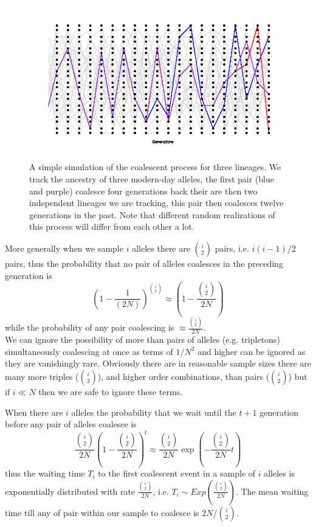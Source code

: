 \begin{figure}
\begin{center}
  \includegraphics[width = \textwidth]{figures/Coalescent_3.png}
\end{center}
\caption{A simple simulation of the coalescent process for three
  lineages. We track the ancestry of 
  three modern-day alleles, the first pair (blue and purple) coalesce four generations back 
  their are then two independent lineages we are tracking, this pair
  then coalesces twelve generations in the past. Note that different
  random realizations of this process will differ from each other a lot.} \label{fig:Coalescent_simulation_3}
\end{figure}


More generally when we sample $i$ alleles there are ${i \choose
 2}$ pairs, i.e. $i(i-1)/2$ pairs, thus the probability that no pair
of alleles coalesces in the preceding generation is
\begin{equation}
\left(1-\frac{1}{(2N)} \right)^{{i \choose
 2}} \approx \left( 1- \frac{{i \choose
 2}}{2N}\right)
\end{equation}
while the probability of any pair coalescing is $\approx \frac{{i \choose
 2}}{2N}$.\\

We can ignore the possibility of more than pairs of alleles (e.g. tripletons) simultaneously
coalescing at once as terms of $1/N^2$ and higher can
be ignored as they are vanishingly rare. Obviously there are in reasonable sample sizes there are
many more triples (${i \choose 3}$), and higher order combinations, than pairs
(${i \choose 2}$) but if $i \ll N$ then we are safe to
ignore these terms.

When there are $i$ alleles the probability that we wait until the
$t+1$ generation before
any pair of alleles coalesce is
\begin{equation}
 \frac{{i \choose
 2}}{2N}\left( 1- \frac{{i \choose
 2}}{2N}\right)^{t} \approx  \frac{{i \choose
 2}}{2N} \exp \left( - \frac{{i \choose
 2}}{2N} t \right)
\end{equation}
thus the waiting time $T_i$ to the first coalescent event in a sample
of $i$ alleles is exponentially distributed with rate $\frac{{i \choose
 2}}{2N}$, i.e. $T_i \sim Exp\left(\frac{{i \choose
 2}}{2N} \right)$. The mean waiting time till any of pair within our
sample to coalesce is $2N/{i \choose
 2}$.\\

